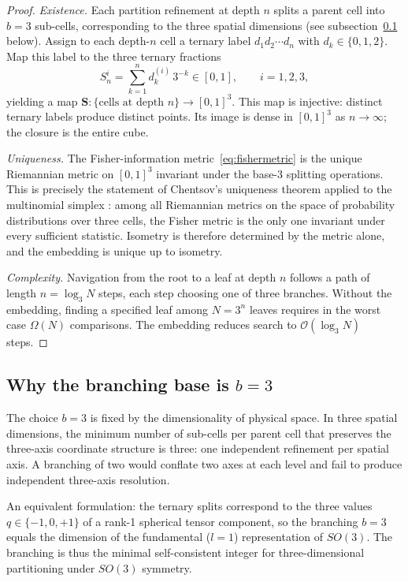 \begin{proof}
\emph{Existence.}  Each partition refinement at depth $n$ splits a parent
cell into $b=3$ sub-cells, corresponding to the three spatial dimensions (see
subsection~\ref{subsec:branchingbase} below).  Assign to each depth-$n$ cell
a ternary label $d_{1}d_{2}\cdots d_{n}$ with $d_{k}\in\{0,1,2\}$.  Map
this label to the three ternary fractions
\[
  S^{i}_{n} = \sum_{k=1}^{n} d_{k}^{(i)}\,3^{-k}\in[0,1], \qquad i=1,2,3,
\]
yielding a map $\mathbf{S}\colon \{\text{cells at depth }n\}\to[0,1]^{3}$.
This map is injective: distinct ternary labels produce distinct points.
Its image is dense in $[0,1]^{3}$ as $n\to\infty$; the closure is the entire
cube.

\emph{Uniqueness.}  The Fisher-information metric~\eqref{eq:fishermetric} is
the unique Riemannian metric on $[0,1]^{3}$ invariant under the base-$3$
splitting operations.  This is precisely the statement of Chentsov's
uniqueness theorem applied to the multinomial simplex \citep{chentsov1982}:
among all Riemannian metrics on the space of probability distributions over
three cells, the Fisher metric is the only one invariant under every
sufficient statistic.  Isometry is therefore determined by the metric alone,
and the embedding is unique up to isometry.

\emph{Complexity.}  Navigation from the root to a leaf at depth $n$ follows
a path of length $n=\log_{3}N$ steps, each step choosing one of three
branches.  Without the embedding, finding a specified leaf among $N=3^{n}$
leaves requires in the worst case $\Omega(N)$ comparisons.  The embedding
reduces search to $\mathcal{O}(\log_{3}N)$ steps.
\end{proof}

\subsection{Why the branching base is $b=3$}
\label{subsec:branchingbase}

The choice $b=3$ is fixed by the dimensionality of physical space.  In three
spatial dimensions, the minimum number of sub-cells per parent cell that
preserves the three-axis coordinate structure is three: one independent
refinement per spatial axis.  A branching of two would conflate two axes at
each level and fail to produce independent three-axis resolution.

An equivalent formulation: the ternary splits correspond to the three values
$q\in\{-1,0,+1\}$ of a rank-1 spherical tensor component, so the branching
$b=3$ equals the dimension of the fundamental ($l=1$) representation of
$SO(3)$.  The branching is thus the minimal self-consistent integer for
three-dimensional partitioning under $SO(3)$ symmetry.

